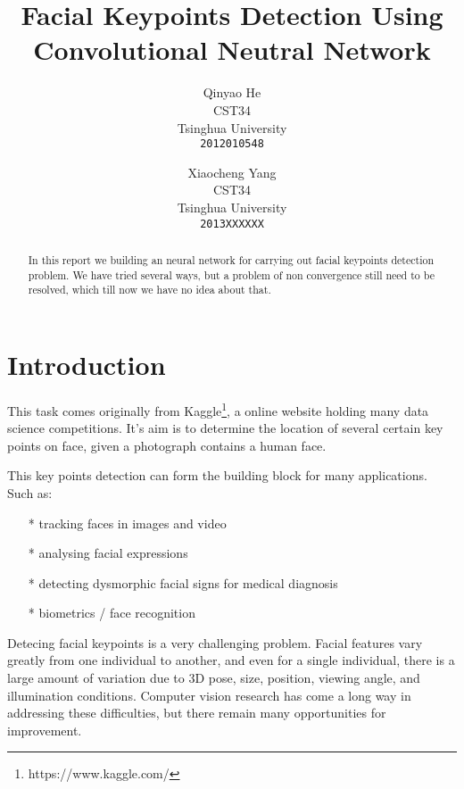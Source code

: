 \documentclass[10pt,twocolumn,letterpaper]{article}
\begin{document}
\title{Facial Keypoints Detection Using Convolutional Neutral Network}

\author{Qinyao He\\
CST34\\
Tsinghua University\\
{\tt\small 2012010548}
\and
Xiaocheng Yang\\
CST34\\
Tsinghua University\\
{\tt\small 2013XXXXXX}
}

\maketitle

\begin{abstract}
   In this report we building an neural network for carrying out facial
   keypoints detection problem. We have tried several ways, but a problem
   of non convergence still need to be resolved, which till now we have no
   idea about that.
\end{abstract}

\section{Introduction}

This task comes originally from Kaggle\footnote{https://www.kaggle.com/},
a online website holding many data science competitions. It's aim is to
determine the location of several certain key points on face, given a photograph
contains a human face.

This key points detection can form the building block for many applications. Such as:
	\begin{itemize}
		\item[*] tracking faces in images and video
		\item[*] analysing facial expressions
		\item[*] detecting dysmorphic facial signs for medical diagnosis
		\item[*] biometrics / face recognition
	\end{itemize}
Detecing facial keypoints is a very challenging problem. 
Facial features vary greatly from one individual to another,
and even for a single individual, there is a large amount of variation
due to 3D pose, size, position, viewing angle, and illumination conditions.
Computer vision research has come a long way in addressing these difficulties,
but there remain many opportunities for improvement.
\end{document}

